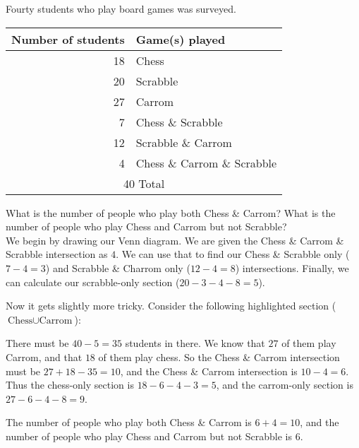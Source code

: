 \begin{boxexample}{}{}
	Fourty students who play board games was surveyed.

	\medskip
	\begin{tabular}{r|l}
		\hline
		Number of students & Game(s) played\\
		\hline
		18 & Chess\\
		20 & Scrabble\\
		27 & Carrom\\
		7  & Chess \& Scrabble\\
		12 & Scrabble \& Carrom\\
		4  & Chess \& Carrom \& Scrabble\\
		\hline
		\multicolumn{2}{c}{40 Total}\\
		\hline
	\end{tabular}
	\medskip

	What is the number of people who play both Chess \& Carrom? What is the number of people who play Chess and Carrom but not Scrabble?\\

	We begin by drawing our Venn diagram. We are given the Chess \& Carrom \& Scrabble intersection as $4$. We can use that to find our Chess \& Scrabble only ($7-4=3$) and Scrabble \& Charrom only ($12-4=8$) intersections. Finally, we can calculate our scrabble-only section ($20-3-4-8=5$).

	\begin{venndiagram3sets}[shade=skyblue,showframe=false,labelA={Chess},labelB={Scrabble},labelC={Carrom},labelABC={4},labelOnlyAB={3},labelOnlyBC={8},labelOnlyB={5}]
	\end{venndiagram3sets}

	Now it gets slightly more tricky. Consider the following highlighted section ($\text{Chess} \cup \text{Carrom}$):

	\begin{venndiagram3sets}[shade=skyblue,showframe=false,labelA={Chess},labelB={Scrabble},labelC={Carrom},labelABC={4},labelOnlyAB={3},labelOnlyBC={8},labelOnlyB={5}]
		\fillA \fillC
	\end{venndiagram3sets}

	There must be $40-5=35$ students in there. We know that $27$ of them play Carrom, and that $18$ of them play chess. So the Chess \& Carrom intersection must be $27+18-35=10$, and the Chess \& Carrom intersection is $10-4=6$. Thus the chess-only section is $18-6-4-3=5$, and the carrom-only section is $27-6-4-8=9$.

	\begin{venndiagram3sets}[shade=skyblue,showframe=false,labelA={Chess},labelB={Scrabble},labelC={Carrom},labelABC={4},labelOnlyAB={3},labelOnlyBC={8},labelOnlyB={5},labelOnlyAC={6},labelOnlyA={5},labelOnlyC={9}]
	\end{venndiagram3sets}

	The number of people who play both Chess \& Carrom is $6+4=10$, and the number of people who play Chess and Carrom but not Scrabble is $6$.
\end{boxexample}
